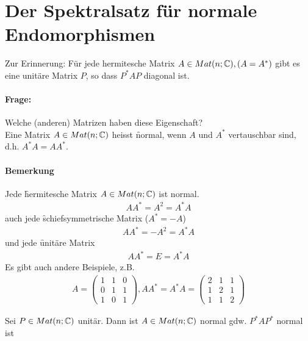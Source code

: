 \section{Der Spektralsatz für normale Endomorphismen}
Zur Erinnerung: Für jede hermitesche Matrix $A \in Mat(n; \mathbb{C}), (A = A^{*})$ gibt es eine unitäre Matrix $P$, so dass $P^{*} A P$ diagonal ist.
\paragraph{Frage:} Welche (anderen) Matrizen haben diese Eigenschaft? \\
Eine Matrix $A \in Mat(n; \mathbb{C})$ heisst \f{normal}, wenn $A$ und $A^{*}$ vertauschbar sind, d.h. $A^{*} A = A A^{*}$.

\paragraph{Bemerkung}
Jede \f{hermitesche} Matrix $A \in Mat(n; \mathbb{C})$ ist normal.
\begin{align}
A A^{*} = A^2 = A^{*} A
\end{align}
auch jede \f{schiefsymmetrische Matrix} ($A^{*} = - A$)
\begin{align}
A A^{*} = - A^2 = A^{*} A
\end{align}
und jede \f{unitäre Matrix}
\begin{align}
A A^{*} =  E = A^{*} A
\end{align}
Es gibt auch andere Beispiele, z.B.
\begin{align}
A = \begin{pmatrix} 1 & 1 & 0 \\ 0 & 1 & 1 \\ 1 & 0 & 1 \end{pmatrix}, A A^{*} = A^{*} A = \begin{pmatrix} 2 & 1 & 1 \\ 1 & 2 & 1 \\ 1 & 1 & 2\end{pmatrix}
\end{align}

\begin{lemma} %
\label{lemma571}
Sei $P \in Mat(n; \mathbb{C})$ unitär. Dann ist $A \in Mat(n; \mathbb{C})$ normal gdw. $P^{*} A P^{*}$ normal ist
\end{lemma}
